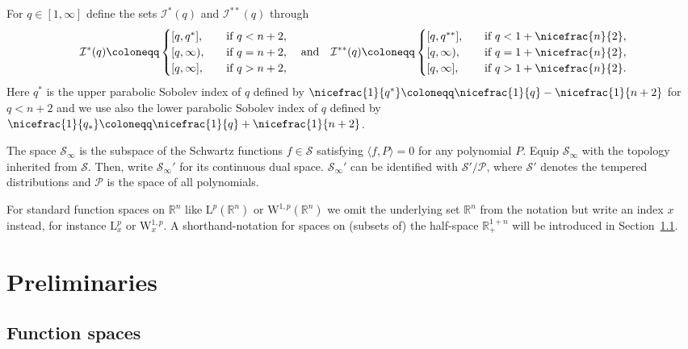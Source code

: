 \documentclass[11pt, leqno]{amsart}
\theoremstyle{definition}
\newcommand{\R}{\mathbb{R}}
\renewcommand{\L}{\mathrm{L}}
\newcommand{\W}{\mathrm{W}}
\renewcommand{\S}{\mathcal{S}}
\newcommand{\Soo}{\mathcal{S}_\infty}
\newcommand{\SobSet}{\mathcal{I}}
\begin{document}
	For $q \in [1,\infty]$ define the sets $\SobSet^*(q)$ and $\SobSet^{**}(q)$ through
	\begin{align}
		\SobSet^*(q) \coloneqq \begin{cases}
			[q, q^*], \quad &\text{if } q < n+2, \\
			[q, \infty), \quad &\text{if } q = n+2, \\
			[q,\infty], \quad &\text{if } q > n+2,
		\end{cases}
		\quad \text{and} \quad
		\SobSet^{**}(q) \coloneqq \begin{cases}
			[q, q^{**}], \quad &\text{if } q < 1 + \nicefrac{n}{2}, \\
			[q, \infty), \quad &\text{if } q = 1 + \nicefrac{n}{2}, \\
			[q,\infty], \quad &\text{if } q > 1 + \nicefrac{n}{2}.
		\end{cases}
	\end{align}
	Here $q^*$ is the upper parabolic Sobolev index of $q$ defined by $\nicefrac{1}{q^*} \coloneqq \nicefrac{1}{q} - \nicefrac{1}{n+2}$ for $q < n+2$ and we use also the lower parabolic Sobolev index of $q$ defined by $\nicefrac{1}{q_{*}} \coloneqq \nicefrac{1}{q} + \nicefrac{1}{n+2}$.

	The space $\Soo$ is the subspace of the Schwartz functions $f\in \S$ satisfying $\langle f, P \rangle = 0$ for any polynomial $P$. Equip $\Soo$ with the topology inherited from $\S$. Then, write $\Soo'$ for its continuous dual space. $\Soo'$ can be identified with $\S'/\mathcal{P}$, where $\S'$ denotes the tempered distributions and $\mathcal{P}$ is the space of all polynomials.

	For standard function spaces on $\R^n$ like $\L^p(\R^n)$ or $\W^{1,p}(\R^n)$ we omit the underlying set $\R^n$ from the notation but write an index $x$ instead, for instance $\L^p_x$ or $\W^{1,p}_x$. A shorthand-notation for spaces on (subsets of) the half-space $\R^{1+n}_+$ will be introduced in Section~\ref{subsec:prelim_function_spaces}.

	\section{Preliminaries}
	\label{sec:prelim}

	\subsection{Function spaces}
	\label{subsec:prelim_function_spaces}
\end{document}
